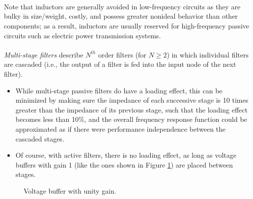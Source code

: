\documentclass{report}
\begin{document}
\\ \\ \\
Note that inductors are generally avoided in low-frequency circuits as they are bulky in size/weight, costly, and possess greater nonideal behavior than other components; as a result, inductors are usually reserved for high-frequency passive circuits such as 
electric power transmission systems. 
\\ \\
\emph{Multi-stage filters} describe $N^{th}$ order filters (for $N\geq 2$) in which individual filters are cascaded (i.e., the output of a filter is fed into the input node of the next filter). 
\begin{itemize}
    \item While multi-stage passive filters do have a loading effect, this can be minimized by making sure the impedance of each successive stage is 10 times greater than the impedance of its previous stage, such that the loading effect becomes less than 10\%, and the overall frequency response function could be approximated as if there were performance independence between the cascaded stages.
    \item Of course, with active filters, there is no loading effect, as long as voltage buffers with gain 1 (like the ones shown in Figure \ref{buffer}) are placed between stages.
\end{itemize}
\begin{figure}[!hbt]
    \centering
    \caption{Voltage buffer with unity gain.}
    \label{buffer}
\end{figure}
\end{document}
